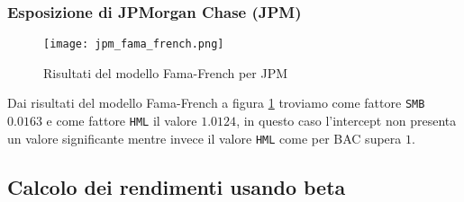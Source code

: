 \pagebreak

\subsubsection{Esposizione di JPMorgan Chase (JPM)}

\begin{figure}[ht]
    \centering
    \texttt{[image: jpm\_fama\_french.png]}
    \caption{Risultati del modello Fama-French per JPM}
    \label{fig:jpm_fama_french}
\end{figure}

Dai risultati del modello Fama-French a figura \ref{fig:jpm_fama_french} troviamo come fattore \verb|SMB| $0.0163$ e come fattore \verb|HML| il valore $1.0124$, 
in questo caso l'intercept non presenta un valore significante mentre invece il valore \verb|HML| come per BAC supera $1$.

\subsection{Calcolo dei rendimenti usando beta}

